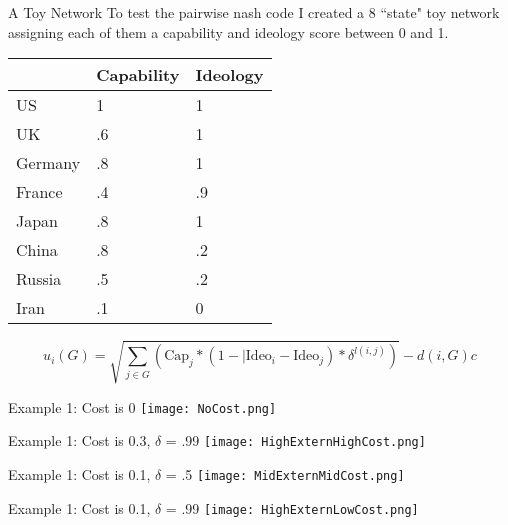 \documentclass{beamer}
\begin{document}
\begin{frame}{A Toy Network}
To test the pairwise nash code I created a 8 ``state" toy network assigning each of them a capability and ideology score between 0 and 1.
\begin{table}
    \begin{tabular}{|l|l|l|}
        \hline
        ~       & Capability & Ideology \\ \hline
        US      & 1          & 1        \\ 
        UK      & .6         & 1        \\ 
        Germany & .8         & 1        \\ 
        France  & .4         & .9       \\ 
        Japan   & .8         & 1        \\ 
        China   & .8         & .2       \\ 
        Russia  & .5         & .2       \\ 
        Iran    & .1         & 0        \\
        \hline
    \end{tabular}
\end{table}
\begin{equation}
u_{i}(G) = \sqrt{\sum_{j \in G} (\text{Cap}_{j} * (1-|\text{Ideo}_{i} - \text{Ideo}_{j}) * \delta^{l(i,j)})} - d(i,G)c
\end{equation}
\end{frame}

\begin{frame}[shrink]{Example 1: Cost is 0}
\pause
\texttt{[image: NoCost.png]}
\end{frame}

\begin{frame}[shrink]{Example 1: Cost is 0.3, $\delta$ = .99}
\texttt{[image: HighExternHighCost.png]}
\end{frame}

\begin{frame}[shrink]{Example 1: Cost is 0.1, $\delta$ = .5}
\texttt{[image: MidExternMidCost.png]}
\end{frame}

\begin{frame}[shrink]{Example 1: Cost is 0.1, $\delta$ = .99}
\texttt{[image: HighExternLowCost.png]}
\end{frame}
\end{document}

